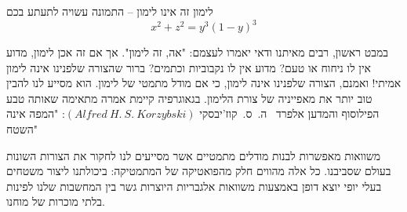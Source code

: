 \begin{surferPage}[%
לימון%
]{%
לימון %
}
זה אינו לימון – התמונה עשויה לתעתע בכם\\
\smallskip
\[x^2 + z^2 = y^3 (1 - y)^3\]


\singlespacing
במבט ראשון, רבים מאיתנו ודאי יאמרו לעצמם: "אה, זה לימון". אך אם זה אכן לימון, מדוע אין לו ניחוח או טעם? מדוע אין לו נקבוביות וכתמים? ברור שהצורה שלפנינו אינה לימון אמיתי!
\singlespacing
ואמנם, הצורה שלפנינו אינה לימון, כי אם מודל מתמטי של לימון. הוא מסייע לנו להבין טוב יותר את מאפייניה של צורת הלימון. בגאוגרפיה קיימת אמרה מתאימה שאותה טבע הפילוסוף והמדען אלפרד \ ה.\ ס.\ קוז'יבסקי $(Alfred\ H.\ S.\ Korzybski)$: "המפה אינה השטח" \\
\singlespacing

משוואות מאפשרות לבנות מודלים מתמטיים אשר מסייעים לנו לחקור את הצורות השונות בעולם שסביבנו.
\singlespacing
כל אלה מהווים חלק מהפואטיקה של המתמטיקה: ביכולתנו ליצור משטחים בעלי יופי יוצא דופן באמצעות משוואות אלגבריות היוצרות גשר בין המחשבות שלנו לפינות בלתי מוכרות של מוחנו.
\end{surferPage}
